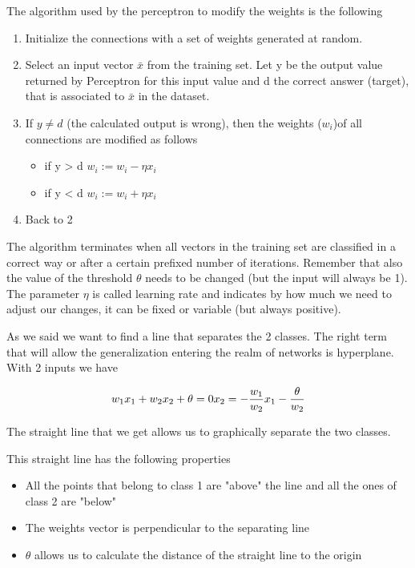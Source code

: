 \vspace{10pt}

The algorithm used by the perceptron to modify the weights is the following

\begin{enumerate}
    \item  Initialize the connections with a set of weights generated at random.
    \item Select an input vector $\bar{x}$ from the training set. Let y be the output
value returned by Perceptron for this input value and d the correct
answer (target), that is associated to $\bar{x}$ in the dataset.
    \item If $y \ne d$ (the calculated output is wrong), then the weights ($w_i$)of all connections are modified as follows
    \begin{itemize}
        \item if y > d $w_i :=w_i-\eta x_i$
        \item if y < d $w_i := w_i + \eta x_i$
    \end{itemize}
    \item Back to 2
\end{enumerate}

The algorithm terminates when all vectors in the training set are classified in a correct way or after a certain prefixed number of iterations. Remember that also the value of the threshold $\theta$ needs to be changed (but the input will always be 1). The parameter $\eta$ is called learning rate and indicates by how much we need to adjust our changes, it can be fixed or variable (but always positive).

\vspace{10pt}

As we said we want to find a line that separates the 2 classes. The right term that will allow the generalization entering the realm of networks is hyperplane. With 2 inputs we have 

\[
w_1x_1 + w_2x_2 + \theta = 0 \\
x_2 = - \frac{w_1}{w_2}x_1 - \frac{\theta}{w_2}
\]

The straight line that we get allows us to graphically separate the two classes.

This straight line has the following properties

\begin{itemize}
    \item All the points that belong to class 1 are "above" the line and all the ones of class 2 are "below"
    \item The weights vector is perpendicular to the separating line
    \item $\theta$ allows us to calculate the distance of the straight line to the origin
\end{itemize}

